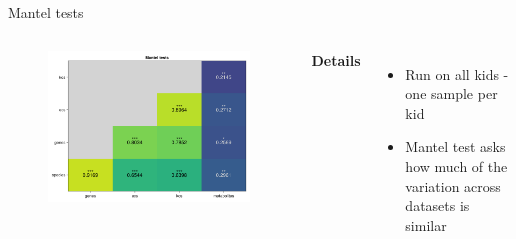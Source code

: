 \begin{frame}{Mantel tests}
    \begin{columns}[c] %

    
        \begin{figure}
        \includegraphics[width=1\linewidth]{../figures/mantel.png}
        \end{figure}

    
        \textbf{Details}
        \begin{itemize}
            \item Run on all kids - one sample per kid
            \item Mantel test asks how much of the variation across datasets is similar
        \end{itemize}

    \end{columns}

\end{frame}

